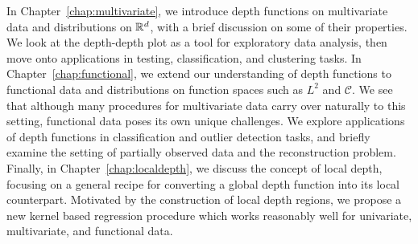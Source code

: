 In Chapter~\ref{chap:multivariate}, we introduce depth functions on
multivariate data and distributions on $\mathbb{R}^d$, with a brief discussion on some
of their properties.
We look at the depth-depth plot as a tool for exploratory data analysis, then
move onto applications in testing, classification, and clustering tasks.
In Chapter~\ref{chap:functional}, we extend our understanding of depth
functions to functional data and distributions on function spaces such as
$L^2$ and $\mathcal{C}$.
We see that although many procedures for multivariate data carry over
naturally to this setting, functional data poses its own unique challenges.
We explore applications of depth functions in classification and outlier
detection tasks, and briefly examine the setting of partially observed data
and the reconstruction problem.
Finally, in Chapter~\ref{chap:localdepth}, we discuss the concept of local
depth, focusing on a general recipe for converting a global depth function
into its local counterpart.
Motivated by the construction of local depth regions, we propose a new kernel
based regression procedure which works reasonably well for univariate,
multivariate, and functional data.
